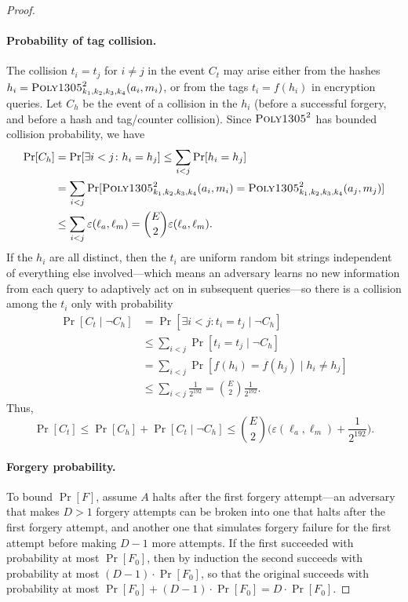 \documentclass[draft]{article}
\DeclareRobustCommand{\operatorsc}[1]{{%
  \ifmmode\let\next=\operatorname\else\let\next=\relax\fi\next{\textsc{#1}}}}
\def\Poly#1/{\operatorsc{Poly#1}}
\newcommand{\given}{\mathrel|}
\newcommand{\collisionbound}{\varepsilon}
\begin{document}
\begin{proof}
\paragraph*{Probability of tag collision.}
The collision $t_i = t_j$ for $i \ne j$ in the event $C_t$ may arise
 either from the hashes
 $h_i = \Poly1305/^2_{k_1,k_2,k_3,k_4}(a_i, m_i)$,
 or from the tags
 $t_i = f(h_i)$
 in encryption queries.
Let $C_h$ be the event of a collision in the $h_i$ (before a successful
 forgery, and before a hash and tag/counter collision).
Since $\Poly1305/^2$ has bounded collision probability, we have
%
\begin{align*}
  \Pr[C_h]
    &= \Pr[\exists i<j\colon h_i = h_j]
     \leq \sum_{i<j} \Pr[h_i = h_j] \\
    &= \sum_{i<j}
         \Pr[\Poly1305/^2_{k_1,k_2,k_3,k_4}(a_i, m_i)
               = \Poly1305/^2_{k_1,k_2,k_3,k_4}(a_j, m_j)] \\
    &\leq \sum_{i<j} \collisionbound(\ell_a, \ell_m)
     = \binom{E}{2} \collisionbound(\ell_a, \ell_m).
\end{align*}
%
If the $h_i$ are all distinct, then the $t_i$ are uniform random bit
 strings independent of everything else involved---which means an
 adversary learns no new information from each query to adaptively act
 on in subsequent queries---so there is a collision among the $t_i$
 only with probability
%
\begin{align*}
  \Pr[C_t \given \lnot C_h]
    &= \Pr[\exists i<j\colon t_i = t_j \given \lnot C_h] \\
    &\leq \sum_{i<j} \Pr[t_i = t_j \given \lnot C_h] \\
    &= \sum_{i<j} \Pr[f(h_i) = f(h_j) \given h_i \ne h_j] \\
    &\leq \sum_{i<j} \frac{1}{2^{192}}
     = \binom{E}{2} \frac{1}{2^{192}}.
\end{align*}
%
Thus,
\[
  \Pr[C_t] \leq \Pr[C_h] + \Pr[C_t \given \lnot C_h]
    \leq \binom{E}{2} \biggl(
        \collisionbound(\ell_a, \ell_m)
        + \frac{1}{2^{192}}
      \biggr).
\]

\paragraph*{Forgery probability.}
To bound $\Pr[F]$, assume $A$ halts after the first forgery
 attempt---an adversary that makes $D>1$ forgery attempts can be broken
 into one that halts after the first forgery attempt, and another one
 that simulates forgery failure for the first attempt before making
 $D-1$ more attempts.
If the first succeeded with probability at most $\Pr[F_0]$, then by
 induction the second succeeds with probability at most
 $(D - 1) \cdot \Pr[F_0]$,
 so that the original succeeds with probability at most
 $\Pr[F_0] + (D - 1) \cdot \Pr[F_0] = D \cdot \Pr[F_0]$.


\end{proof}
\end{document}
